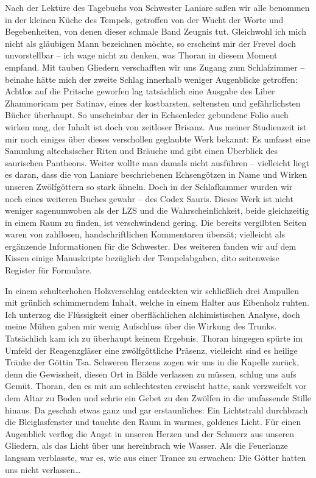 Nach der Lektüre des Tagebuchs von Schwester Laniare saßen wir alle benommen in der kleinen Küche des Tempels, getroffen von der Wucht der Worte und Begebenheiten, von denen dieser schmale Band Zeugnis tut. Gleichwohl ich mich nicht als gläubigen Mann bezeichnen möchte, so erscheint mir der Frevel doch unvorstellbar -- ich wage nicht zu denken, was Thoran in diesem Moment empfand. Mit tauben Gliedern verschafften wir uns Zugang zum Schlafzimmer -- beinahe hätte mich der zweite Schlag innerhalb weniger Augenblicke getroffen: Achtlos auf die Pritsche geworfen lag tatsächlich eine Ausgabe des Liber Zhammoricam per Satinav, eines der kostbarsten, seltensten und gefährlichsten Bücher überhaupt. So unscheinbar der in Echsenleder gebundene Folio auch wirken mag, der Inhalt ist doch von zeitloser Brisanz. Aus meiner Studienzeit ist mir noch einiges über dieses verschollen geglaubte Werk bekannt: Es umfasst eine Sammlung altechsischer Riten und Bräuche und gibt einen Überblick des saurischen Pantheons. Weiter wollte man damals nicht ausführen -- vielleicht liegt es daran, dass die von Laniare beschriebenen Echsengötzen in Name und Wirken unseren Zwölfgöttern so stark ähneln. Doch in der Schlafkammer wurden wir noch eines weiteren Buches gewahr -- des Codex Sauris. Dieses Werk ist nicht weniger sagenumwoben als der LZS und die Wahrscheinlichkeit, beide gleichzeitig in einem Raum zu finden, ist verschwindend gering. Die bereits vergilbten Seiten waren von zahllosen, handschriftlichen Kommentaren übersät; vielleicht als ergänzende Informationen für die Schwester. Des weiteren fanden wir auf dem Kissen einige Manuskripte bezüglich der Tempelabgaben, dito seitenweise Register für Formulare.\par

In einem schulterhohen Holzverschlag entdeckten wir schließlich drei Ampullen mit grünlich schimmerndem Inhalt, welche in einem Halter aus Eibenholz ruhten. Ich unterzog die Flüssigkeit einer oberflächlichen alchimistischen Analyse, doch meine Mühen gaben mir wenig Aufschluss über die Wirkung des Trunks. Tatsächlich kam ich zu überhaupt keinem Ergebnis. Thoran hingegen spürte im Umfeld der Reagenzgläser eine zwölfgöttliche Präsenz, vielleicht sind es heilige Tränke der Göttin Tsa. Schweren Herzens zogen wir uns in die Kapelle zurück, denn die Gewissheit, diesen Ort in Bälde verlassen zu müssen, schlug uns aufs Gemüt. Thoran, den es mit am schlechtesten erwischt hatte, sank verzweifelt vor dem Altar zu Boden und schrie ein Gebet zu den Zwölfen in die umfassende Stille hinaus. Da geschah etwas ganz und gar erstaunliches: Ein Lichtstrahl durchbrach die Bleiglasfenster und tauchte den Raum in warmes, goldenes Licht. Für einen Augenblick verflog die Angst in unseren Herzen und der Schmerz aus unseren Gliedern, als das Licht über uns hereinbrach wie Wasser. Als die Feuerlanze langsam verblasste, war es, wie aus einer Trance zu erwachen: Die Götter hatten uns nicht verlassen…

